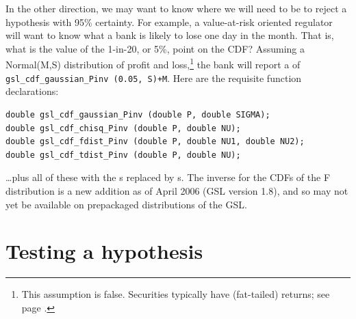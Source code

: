 In the other direction, we may want to know where we will need to be to reject a hypothesis with 95\%
certainty. For example, a value-at-risk oriented regulator will want to know what a bank is likely to lose 
one day in the month. That is, what is the value of the 1-in-20, or 5\%, point on the CDF?
Assuming a Normal(M,S) distribution of profit and loss,\footnote{This assumption is false. Securities
typically have  (fat-tailed) returns; see page \pageref{kurt1}.} the bank will report a  of {\tt
gsl\_cdf\_gaussian\_Pinv (0.05, S)+M}. Here are the requisite function declarations:
\begin{lstlisting}
double gsl_cdf_gaussian_Pinv (double P, double SIGMA);
double gsl_cdf_chisq_Pinv (double P, double NU);
double gsl_cdf_fdist_Pinv (double P, double NU1, double NU2);
double gsl_cdf_tdist_Pinv (double P, double NU);
\end{lstlisting}
\dots plus all of these with the s replaced by s.
The inverse for the CDFs of the F distribution is a new addition as of
April 2006 (GSL version 1.8), and so may not yet be available on prepackaged
distributions of the GSL.





\section{Testing a hypothesis}




